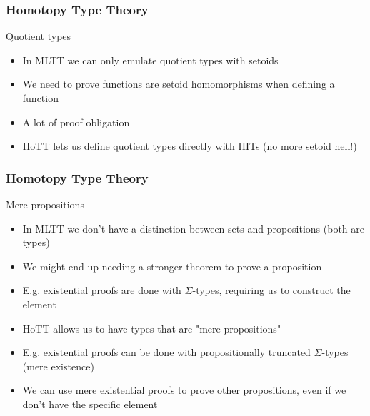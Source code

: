 \documentclass{beamer}
\begin{document}
\begin{frame}
\frametitle{Homotopy Type Theory}

Quotient types

\begin{itemize}

  \item In MLTT we can only emulate quotient types with setoids
  \item We need to prove functions are setoid homomorphisms when defining a function
  \item A lot of proof obligation
  \item HoTT lets us define quotient types directly with HITs (no more setoid hell!)

\end{itemize}

\end{frame}

\begin{frame}
\frametitle{Homotopy Type Theory}

Mere propositions

\begin{itemize}

  \item In MLTT we don't have a distinction between sets and propositions (both are types)
  \item We might end up needing a stronger theorem to prove a proposition
  \item E.g. existential proofs are done with $\Sigma$-types, requiring us to construct the element
  \item HoTT allows us to have types that are "mere propositions"
  \item E.g. existential proofs can be done with propositionally truncated $\Sigma$-types (mere existence)
  \item We can use mere existential proofs to prove other propositions, even if we don't have the specific element

\end{itemize}

\end{frame}
\end{document}
